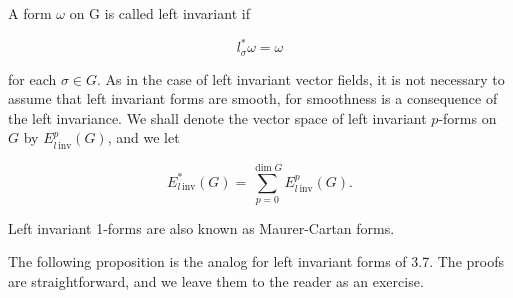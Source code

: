 \begin{definition}\label{thm:3.11}
A form  $ \omega $ on G is called left invariant if

\begin{equation}
\tag{1}\label{eq:3.11:1}
l_{\sigma}^{*}\omega=\omega
\end{equation}

for each $\sigma \in G$. As in the case of left invariant vector fields, it is not necessary to assume that left invariant forms are smooth, for smoothness is a consequence of the left invariance. We shall denote the vector space of left invariant $p$-forms on $G$ by $E_{l\,\mathrm{inv}}^{p}(G)$, and we let 

\begin{equation}
\tag{2}\label{eq:3.11:2}
E^{*}_{l\,\mathrm{inv}}(G)=\sum_{p=0}^{\dim G}E_{l\,\mathrm{inv}}^{p}(G).
\end{equation}

Left invariant 1-forms are also known as Maurer-Cartan forms. 

\end{definition}

The following proposition is the analog for left invariant forms of 3.7. The proofs are straightforward, and we leave them to the reader as an exercise.

